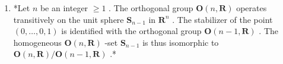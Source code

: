 \begin{enumerate}
\def\labelenumi{(\arabic{enumi})}
\setcounter{enumi}{2}
\tightlist
\item
  *Let \(n\) be an integer \(\geqslant 1\) . The orthogonal group \(\mathbf{O}(n, \mathbf{R})\) operates transitively on the unit sphere \(\mathbf{S}_{n-1}\) in \(\mathbf{R}^n\) . The stabilizer of the point \((0, \ldots, 0, 1)\) is identified with the orthogonal group \(\mathbf{O}(n-1, \mathbf{R})\) . The homogeneous \(\mathbf{O}(n, \mathbf{R})\) -set \(\mathbf{S}_{n-1}\) is thus isomorphic to \(\mathbf{O}(n, \mathbf{R}) / \mathbf{O}(n-1, \mathbf{R})\) .*
\end{enumerate}

